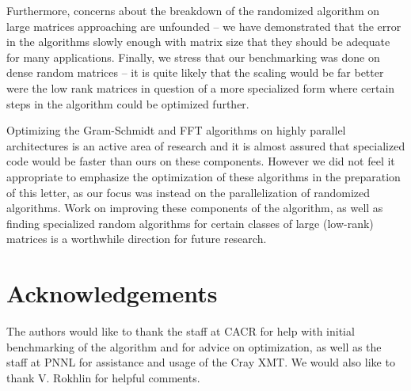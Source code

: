 \documentclass[11pt]{article}
\begin{document}
Furthermore, concerns about the breakdown of the randomized algorithm on large matrices approaching are unfounded -- we have demonstrated that the error in the algorithms slowly enough with matrix size that they should be adequate for many applications.  Finally, we stress that our benchmarking was done on dense random matrices -- it is quite likely that the scaling would be far better were the low rank matrices in question of a more specialized form where certain steps in the algorithm could be optimized further.

Optimizing the Gram-Schmidt and FFT algorithms on highly parallel architectures is an active area of research and it is almost assured that specialized code would be  faster than ours on these components.  However we did not feel it appropriate to emphasize the optimization of these algorithms in the preparation of this letter, as our focus was instead on the parallelization of randomized algorithms.  Work on improving these components of the algorithm, as well as finding specialized random algorithms for certain classes of large (low-rank) matrices is a worthwhile direction for future research.

\section*{Acknowledgements}
The authors would like to thank the staff at CACR for help with initial benchmarking of the algorithm and for advice on optimization, as well as the staff at PNNL for assistance and usage of the Cray XMT.   We would also like to thank V. Rokhlin for helpful comments.



\end{document}
